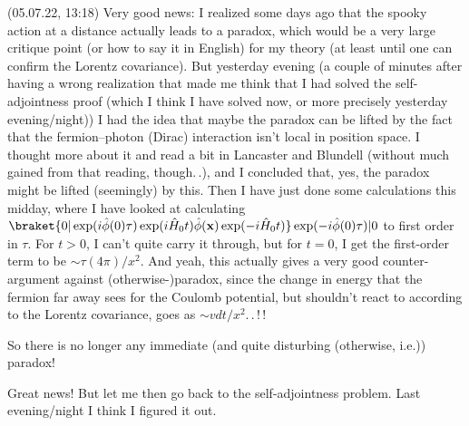\documentclass{report}
\begin{document}
(05.07.22, 13:18) Very good news: I realized some days ago that the spooky action at a distance actually leads to a paradox, which would be a very large critique point (or how to say it in English) for my theory (at least until one can confirm the Lorentz covariance). But yesterday evening (a couple of minutes after having a wrong realization that made me think that I had solved the self-adjointness proof (which I think I have solved now, or more precisely yesterday evening/night)) I had the idea that maybe the paradox can be lifted by the fact that the fermion--photon (Dirac) interaction isn't local in position space. I thought more about it and read a bit in Lancaster and Blundell (without much gained from that reading, though.\,.), and I concluded that, yes, the paradox might be lifted (seemingly) by this. Then I have just done some calculations this midday, where I have looked at calculating $\braket{0 | \exp(i\hat \phi(0) \tau) \exp(i\hat H_0 t) 
	\hat \phi(\mathbf{x}) 
\exp(-i\hat H_0 t)} \exp(-i\hat \phi(0) \tau) | 0
$
to first order in $\tau$. For $t>0$, I can't quite carry it through, but for $t=0$, I get the first-order term to be $\sim \tau (4\pi)/x^2$. And yeah, this actually gives a very good counter-argument against (otherwise-)paradox, since the change in energy that the fermion far away sees for the Coulomb potential, but shouldn't react to according to the Lorentz covariance, goes as $\sim v dt/x^2$.\,.\,!\,! %

So there is no longer any immediate (and quite disturbing (otherwise, i.e.)) paradox!

Great news! But let me then go back to the self-adjointness problem. Last evening/night I think I figured it out. 
\end{document}

